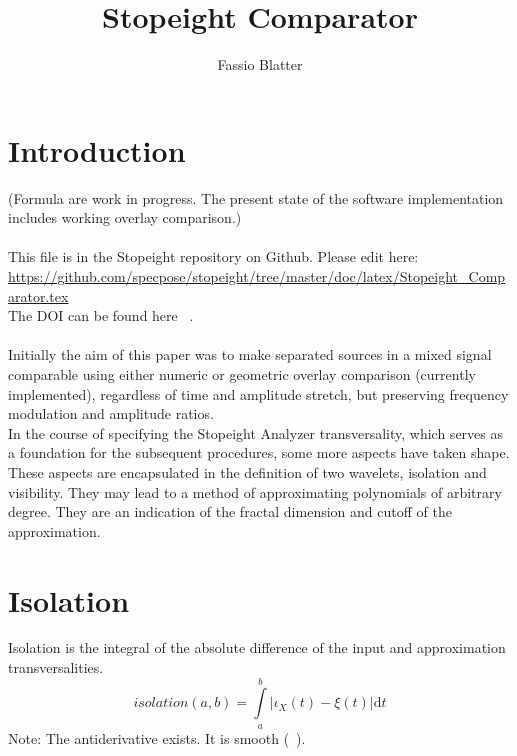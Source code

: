 \documentclass{report}
\begin{document}
\title{Stopeight Comparator}
\author{Fassio Blatter}
\maketitle

\chapter{Introduction}
(Formula are work in progress. The present state of the software implementation includes working overlay comparison.)\\\\
This file is in the Stopeight repository on Github. Please edit here:\\
\href{https://github.com/specpose/stopeight/tree/master/doc/latex/Stopeight\_Comparator.tex}{https://github.com/specpose/stopeight/tree/master/doc/latex/Stopeight\_Comparator.tex}\\
The DOI can be found here ~\cite{Stopeight}.\\\\
Initially the aim of this paper was to make separated sources in a mixed signal comparable using either numeric or geometric overlay comparison (currently implemented), regardless of time and amplitude stretch, but preserving frequency modulation and amplitude ratios.\\
In the course of specifying the Stopeight Analyzer transversality, which serves as a foundation for the subsequent procedures, some more aspects have taken shape. These aspects are encapsulated in the definition of two wavelets, isolation and visibility. They may lead to a method of approximating polynomials of arbitrary degree. They are an indication of the fractal dimension and cutoff of the approximation.

\chapter{Isolation}
Isolation is the integral of the absolute difference of the input and approximation transversalities.
\begin{equation}
isolation(a,b)=\int \limits _{a}^{b} \vert\iota_{X}(t)-\xi(t)\vert \mathrm{d}t
\end{equation}
Note: The antiderivative exists. It is smooth (~\cite[Riemann Integrable]{Widon}).\\\\
\end{document}
